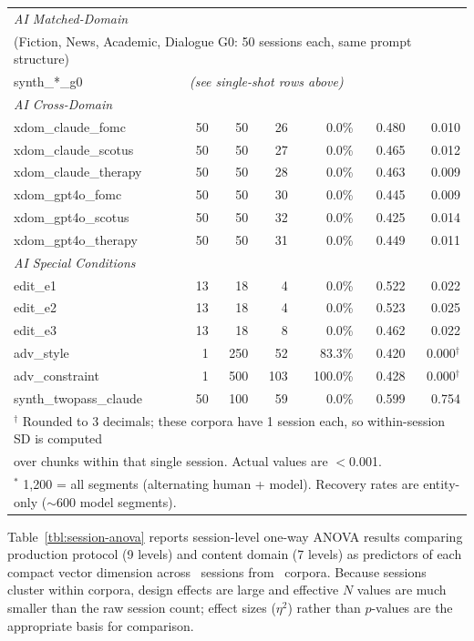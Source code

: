 \documentclass[final]{clv2025}
\begin{document}
\begin{table}[h!]
\begin{tabular}{lrrrrrr}
\midrule
\multicolumn{7}{l}{\textit{AI Matched-Domain}} \\
\multicolumn{7}{l}{(Fiction, News, Academic, Dialogue G0: 50 sessions each, same prompt structure)} \\
synth\_*\_g0 & \multicolumn{6}{l}{\textit{(see single-shot rows above)}} \\
\midrule
\multicolumn{7}{l}{\textit{AI Cross-Domain}} \\
xdom\_claude\_fomc & 50 & 50 & 26 & 0.0\% & 0.480 & 0.010 \\
xdom\_claude\_scotus & 50 & 50 & 27 & 0.0\% & 0.465 & 0.012 \\
xdom\_claude\_therapy & 50 & 50 & 28 & 0.0\% & 0.463 & 0.009 \\
xdom\_gpt4o\_fomc & 50 & 50 & 30 & 0.0\% & 0.445 & 0.009 \\
xdom\_gpt4o\_scotus & 50 & 50 & 32 & 0.0\% & 0.425 & 0.014 \\
xdom\_gpt4o\_therapy & 50 & 50 & 31 & 0.0\% & 0.449 & 0.011 \\
\midrule
\multicolumn{7}{l}{\textit{AI Special Conditions}} \\
edit\_e1 & 13 & 18 & 4 & 0.0\% & 0.522 & 0.022 \\
edit\_e2 & 13 & 18 & 4 & 0.0\% & 0.523 & 0.025 \\
edit\_e3 & 13 & 18 & 8 & 0.0\% & 0.462 & 0.022 \\
adv\_style & 1 & 250 & 52 & 83.3\% & 0.420 & 0.000$^\dagger$ \\
adv\_constraint & 1 & 500 & 103 & 100.0\% & 0.428 & 0.000$^\dagger$ \\
synth\_twopass\_claude & 50 & 100 & 59 & 0.0\% & 0.599 & 0.754 \\
\bottomrule
\multicolumn{7}{l}{\footnotesize $^\dagger$ Rounded to 3 decimals; these corpora have 1 session each, so within-session SD is computed} \\
\multicolumn{7}{l}{\footnotesize \phantom{$^\dagger$} over chunks within that single session. Actual values are $<$0.001.} \\
\multicolumn{7}{l}{\footnotesize $^*$ 1,200 = all segments (alternating human + model). Recovery rates are entity-only ($\sim$600 model segments).} \\
\end{tabular}
\end{table}

\clearpage


Table~\ref{tbl:session-anova} reports session-level one-way ANOVA results comparing production protocol (9 levels) and content domain (7 levels) as predictors of each compact vector dimension across \anovaSessions\ sessions from \anovaCorpora\ corpora. Because sessions cluster within corpora, design effects are large and effective $N$ values are much smaller than the raw session count; effect sizes ($\eta^2$) rather than $p$-values are the appropriate basis for comparison.
\end{document}
